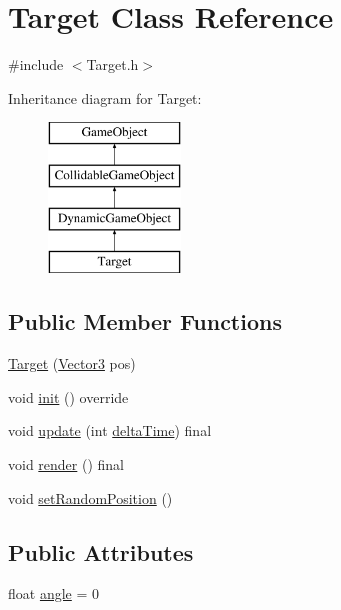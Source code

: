 \hypertarget{class_target}{}\section{Target Class Reference}
\label{class_target}


{\ttfamily \#include $<$Target.\+h$>$}

Inheritance diagram for Target\+:\begin{figure}[H]
\begin{center}
\leavevmode
\includegraphics[height=4.000000cm]{class_target}
\end{center}
\end{figure}
\subsection*{Public Member Functions}
\begin{DoxyCompactItemize}
\item 
\hyperlink{class_target_ac423f1beea52507028b21180c3eadfd8}{Target} (\hyperlink{class_vector3}{Vector3} pos)
\item 
void \hyperlink{class_target_aca691803b6bb7185adc521d63cdd7835}{init} () override
\item 
void \hyperlink{class_target_a5f3b2dc70e8065e53199ab3244059ba7}{update} (int \hyperlink{_game_manager_8h_afea6a95c7a1c119b7106a4c735eb259d}{delta\+Time}) final
\item 
void \hyperlink{class_target_a03e4fae56bd104dadf5cec8247452c7e}{render} () final
\item 
void \hyperlink{class_target_a47eab7761cd91403698a23c65806cb28}{set\+Random\+Position} ()
\end{DoxyCompactItemize}
\subsection*{Public Attributes}
\begin{DoxyCompactItemize}
\item 
float \hyperlink{class_target_a55c8a14bee479115991505ae6dfff18a}{angle} = 0
\end{DoxyCompactItemize}
